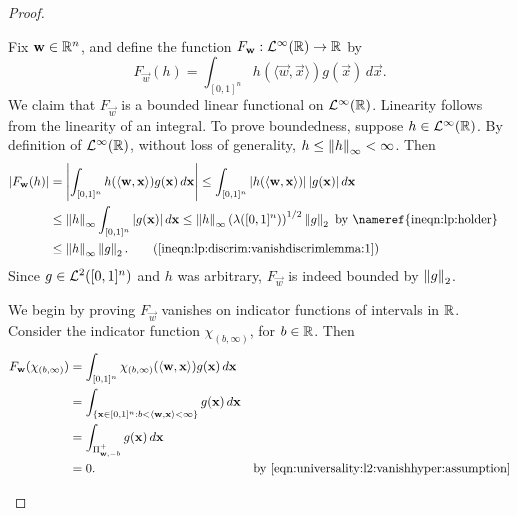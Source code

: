 \begin{proof}
\setcounter{step}{0}
\begin{step}
Fix $\mathbf{w} \in {\mathbb R}^n$, and define the function $F_\mathbf{w} : {\mathcal {L}^\infty}({\mathbb R}) \to {\mathbb R}$ by \[
    F_{\vec{w}}(h) = \int_{[0,1]^n} h ( \langle \vec{w}, \vec{x} \rangle) g(\vec{x}) \, d \vec{x}.
\]
We claim that $F_\vec{w}$ is a bounded linear functional on ${\mathcal {L}^\infty}({\mathbb R})$. Linearity follows from the linearity of an integral. To prove boundedness, suppose $h \in {\mathcal {L}^\infty}({\mathbb R})$. By definition of ${\mathcal {L}^\infty}({\mathbb R})$, without loss of generality, $h \leq \left\lVert h\right\rVert_\infty < \infty$. Then
\begin{subequations}\label{ineqn:lp:discrim:vanishdiscrimlemma:1}
\begin{align*}
     | F_{\vec{w}}(h) | &= \left | \int_{[0,1]^n} h ( \langle \vec{w}, \vec{x} \rangle) g(\vec{x}) \, d \vec{x} \right | \leq  \int_{[0,1]^n} \left |  h ( \langle \vec{w}, \vec{x} \rangle)  \right | |  g(\vec{x}) |  \, d \vec{x} &\\
     &\leq \norm{h}_\infty \int_{[0,1]^n} |  g(\vec{x}) | \, d\vec{x} \leq \norm{h}_\infty \left ( \lambda([0,1]^n) \right)^{1/2} \norm{g}_2 \text{    by \nameref{ineqn:lp:holder}} \\
     &\leq \norm{h}_\infty \norm{g}_2. \tag{\ref{ineqn:lp:discrim:vanishdiscrimlemma:1}} 
\end{align*}
\end{subequations}
Since $g \in {\mathcal {L}^2}([0,1]^n)$ and $h$ was arbitrary, $F_{\vec{w}}$ is indeed bounded by $\left\lVert g\right\rVert_2$.
\end{step}
\begin{step}
We begin by proving $F_\vec{w}$ vanishes on indicator functions of intervals in ${\mathbb R}$.
Consider the indicator function $\chi_{(b, \infty)}$, for $b \in {\mathbb R}$. Then
\begin{subequations}\label{eqn:universality:l2:vanishhyper:vanish_open}
\begin{align*}
    F_{\vec{w}}(\chi_{(b, \infty)}) &=  \int_{[0,1]^n} \chi_{(b, \infty)}( \langle \vec{w}, \vec{x} \rangle) g(\vec{x}) \, d \vec{x} \\
    &=   \int_{\{ \vec{x} \in [0,1]^n : b < \langle \vec{w}, \vec{x}  \rangle < \infty  \}} g(\vec{x}) \, d \vec{x} \\
    &= \int_{ \Pi_{\vec{w}, -b}^{+} } g(\vec{x}) \, d \vec{x} \\
    &= 0. & \text{by \ref{eqn:universality:l2:vanishhyper:assumption}}

\end{align*}
\end{subequations}
\end{step}
\end{proof}
